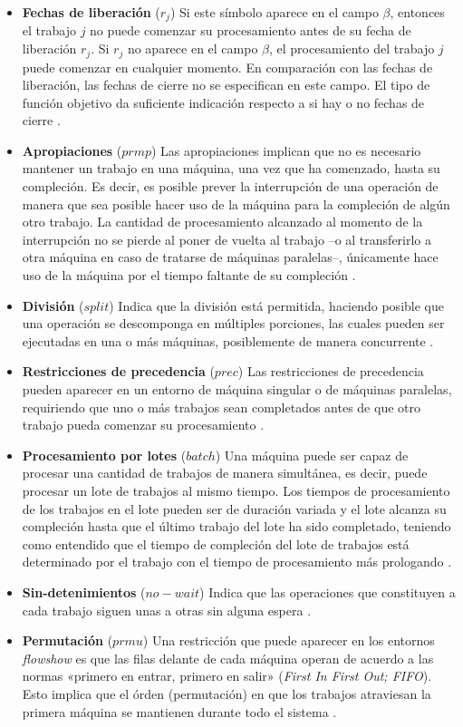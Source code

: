\documentclass[spanish,draft,12pt,headsepline,footsepline,paper=letter]{scrreprt}
\begin{document}
\begin{itemize}
  \item \textbf{Fechas de liberación} ($r_j$) Si este símbolo aparece en el campo $\beta$, entonces el trabajo $j$ no puede comenzar su procesamiento antes de su fecha de liberación $r_j$. Si $r_j$ no aparece en el campo $\beta$, el procesamiento del trabajo $j$ puede comenzar en cualquier momento. En comparación con las fechas de liberación, las fechas de cierre no se especifican en este campo. El tipo de función objetivo da suficiente indicación respecto a si hay o no fechas de cierre \citep[p.~16]{Pinedo1995}.
  \item \textbf{Apropiaciones} ($prmp$) Las apropiaciones implican que no es necesario mantener un trabajo en una máquina, una vez que ha comenzado, hasta su compleción. Es decir, es posible prever la interrupción de una operación de manera que sea posible hacer uso de la máquina para la compleción de algún otro trabajo. La cantidad de procesamiento alcanzado al momento de la interrupción no se pierde al poner de vuelta al trabajo –o al transferirlo a otra máquina en caso de tratarse de máquinas paralelas–, únicamente hace uso de la máquina por el tiempo faltante de su compleción \citep[p.~16, p.~10]{Pinedo1995,TKindt2002}.
  \item \textbf{División} ($split$) Indica que la división está permitida, haciendo posible que una operación se descomponga en múltiples porciones, las cuales pueden ser ejecutadas en una o más máquinas, posiblemente de manera concurrente \citep[p.~10]{TKindt2002}.
  \item \textbf{Restricciones de precedencia} ($prec$) Las restricciones de precedencia pueden aparecer en un entorno de máquina singular o de máquinas paralelas, requiriendo que uno o más trabajos sean completados antes de que otro trabajo pueda comenzar su procesamiento \citep[p.~16]{Pinedo1995}.
  \item \textbf{Procesamiento por lotes} ($batch$) Una máquina puede ser capaz de procesar una cantidad de trabajos de manera simultánea, es decir, puede procesar un lote de trabajos al mismo tiempo. Los tiempos de procesamiento de los trabajos en el lote pueden ser de duración variada y el lote alcanza su compleción hasta que el último trabajo del lote ha sido completado, teniendo como entendido que el tiempo de compleción del lote de trabajos está determinado por el trabajo con el tiempo de procesamiento más prologando \citep[p.~16]{Pinedo1995}.
  \item \textbf{Sin-detenimientos} ($no-wait$) Indica que las operaciones que constituyen a cada trabajo siguen unas a otras sin alguna espera \citep[p.~11]{TKindt2002}.
  \item \textbf{Permutación} ($prmu$) Una restricción que puede aparecer en los entornos \textit{flowshow} es que las filas delante de cada máquina operan de acuerdo a las normas «primero en entrar, primero en salir» (\textit{First In First Out; FIFO}). Esto implica que el órden (permutación) en que los trabajos atraviesan la primera máquina se mantienen durante todo el sistema \citep[p.~17]{Pinedo1995}.
\end{itemize}
\end{document}
